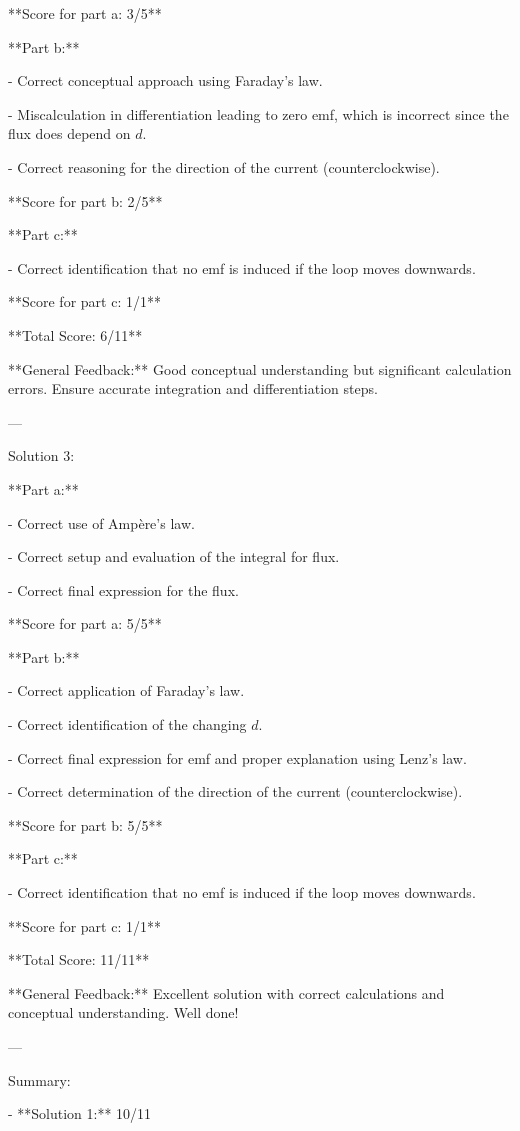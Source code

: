 \documentclass[a4paper,11pt]{article}
\begin{document}
**Score for part a: 3/5**

**Part b:**

- Correct conceptual approach using Faraday's law.

- Miscalculation in differentiation leading to zero emf, which is incorrect since the flux does depend on \( d \).

- Correct reasoning for the direction of the current (counterclockwise).

**Score for part b: 2/5**

**Part c:**

- Correct identification that no emf is induced if the loop moves downwards.

**Score for part c: 1/1**

**Total Score: 6/11**

**General Feedback:** Good conceptual understanding but significant calculation errors. Ensure accurate integration and differentiation steps.

---

Solution 3:

**Part a:**

- Correct use of Ampère's law.

- Correct setup and evaluation of the integral for flux.

- Correct final expression for the flux.

**Score for part a: 5/5**

**Part b:**

- Correct application of Faraday's law.

- Correct identification of the changing \( d \).

- Correct final expression for emf and proper explanation using Lenz's law.

- Correct determination of the direction of the current (counterclockwise).

**Score for part b: 5/5**

**Part c:**

- Correct identification that no emf is induced if the loop moves downwards.

**Score for part c: 1/1**

**Total Score: 11/11**

**General Feedback:** Excellent solution with correct calculations and conceptual understanding. Well done!

---

Summary:

- **Solution 1:** 10/11
\end{document}
